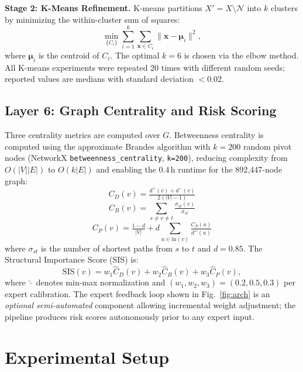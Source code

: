 \documentclass[conference]{IEEEtran}
\begin{document}
\textbf{Stage 2: K-Means Refinement.}
K-means partitions $X' = X \setminus \mathcal{N}$ into $k$
clusters by minimizing the within-cluster sum of squares:
\begin{equation}
  \min_{\{C_i\}} \sum_{i=1}^{k}
  \sum_{\mathbf{x} \in C_i}
  \|\mathbf{x} - \boldsymbol{\mu}_i\|^2,
\end{equation}
where $\boldsymbol{\mu}_i$ is the centroid of $C_i$. The
optimal $k\!=\!6$ is chosen via the elbow method. All K-means
experiments were repeated 20 times with different random seeds;
reported values are medians with standard deviation $<$0.02.

\subsection{Layer 6: Graph Centrality and Risk Scoring}
Three centrality metrics are computed over $G$.
Betweenness centrality is computed using the approximate Brandes
algorithm with $k\!=\!200$ random pivot nodes (NetworkX
\texttt{betweenness\_centrality}, \texttt{k=200}), reducing
complexity from $O(|V||E|)$ to $O(k|E|)$ and enabling the
0.4\,h runtime for the 892{,}447-node graph:
\begin{equation}\label{eq:degree}
  C_D(v) = \tfrac{d^+(v)+d^-(v)}{2(|V|-1)}
\end{equation}
\begin{equation}\label{eq:between}
  C_B(v) = \textstyle\sum_{s \neq v \neq t}
            \tfrac{\sigma_{st}(v)}{\sigma_{st}}
\end{equation}
\begin{equation}\label{eq:pagerank}
  C_P(v) = \tfrac{1-d}{|V|} +
            d\!\textstyle\sum_{u \in \mathrm{in}(v)}
            \tfrac{C_P(u)}{d^+(u)}
\end{equation}
where $\sigma_{st}$ is the number of shortest paths from $s$ to
$t$ and $d\!=\!0.85$. The Structural Importance Score (SIS) is:
\begin{equation}
  \mathrm{SIS}(v) =
    w_1 \hat{C}_D(v) + w_2 \hat{C}_B(v) + w_3 \hat{C}_P(v),
\end{equation}
where $\hat{\cdot}$ denotes min-max normalization and
$(w_1,w_2,w_3)\!=\!(0.2,0.5,0.3)$ per expert calibration.
The expert feedback loop shown in Fig.~\ref{fig:arch} is an
\emph{optional semi-automated} component allowing incremental
weight adjustment; the pipeline produces risk scores
autonomously prior to any expert input.

\section{Experimental Setup}
\end{document}
